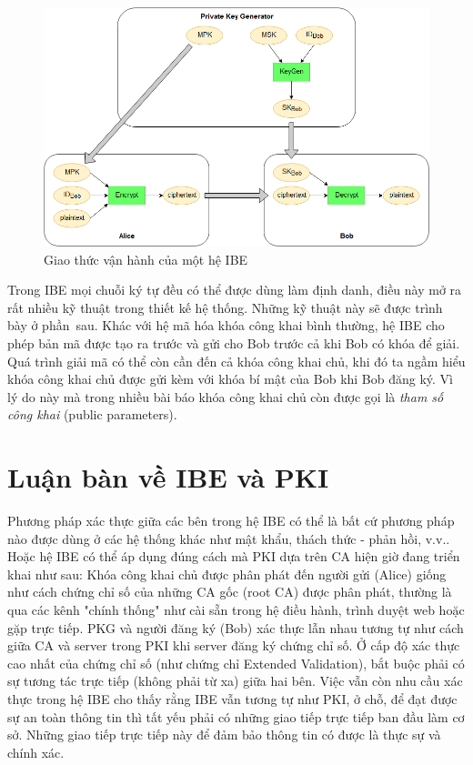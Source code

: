 \documentclass[class=report, crop=false]{standalone}
\begin{document}
		\begin{figure}[h]
			\captionsetup{font=normalsize}
			\includegraphics[width=\textwidth]{ibe_protocol.png}
			\centering
			\caption{Giao thức vận hành của một hệ IBE}
		\end{figure}
		\newpage
		Trong IBE mọi chuỗi ký tự đều có thể được dùng làm định danh, điều này mở ra rất nhiều kỹ thuật trong thiết kế hệ thống. Những kỹ thuật này sẽ được trình bày ở phần~sau. Khác với hệ mã hóa khóa công khai bình thường, hệ IBE cho phép bản mã được tạo ra trước và gửi cho Bob trước cả khi Bob có khóa để giải. Quá trình giải mã có thể còn cần đến cả khóa công khai chủ, khi đó ta ngầm hiểu khóa công khai chủ được gửi kèm với khóa bí mật của Bob khi Bob đăng ký. Vì lý do này mà trong nhiều bài báo khóa công khai chủ còn được gọi là \textit{tham số công khai} (public parameters).
	\section{Luận bàn về IBE và PKI}\label{fig:ibe_vs_pki}
		Phương pháp xác thực giữa các bên trong hệ IBE có thể là bất cứ phương pháp nào được dùng ở các hệ thống khác như mật khẩu, thách thức - phản hồi, v.v.. Hoặc hệ IBE có thể áp dụng đúng cách mà PKI dựa trên CA hiện giờ đang triển khai như sau: Khóa công khai chủ được phân phát đến người gửi (Alice) giống như cách chứng chỉ số của những CA gốc (root CA) được phân phát, thường là qua các kênh "chính thống" như cài sẵn trong hệ điều hành, trình duyệt web hoặc gặp trực tiếp. PKG và người đăng ký (Bob) xác thực lẫn nhau tương tự như cách giữa CA và server trong PKI khi server đăng ký chứng chỉ số. Ở cấp độ xác thực cao nhất của chứng chỉ số (như chứng chỉ Extended Validation), bắt buộc phải có sự tương tác trực tiếp (không phải từ xa) giữa hai bên. Việc vẫn còn nhu cầu xác thực trong hệ IBE cho thấy rằng IBE vẫn tương tự như PKI, ở chỗ, để đạt được sự an toàn thông tin thì tất yếu phải có những giao tiếp trực tiếp ban đầu làm cơ sở. Những giao tiếp trực tiếp này để đảm bảo thông tin có được là thực sự và chính xác.
		
\end{document}
